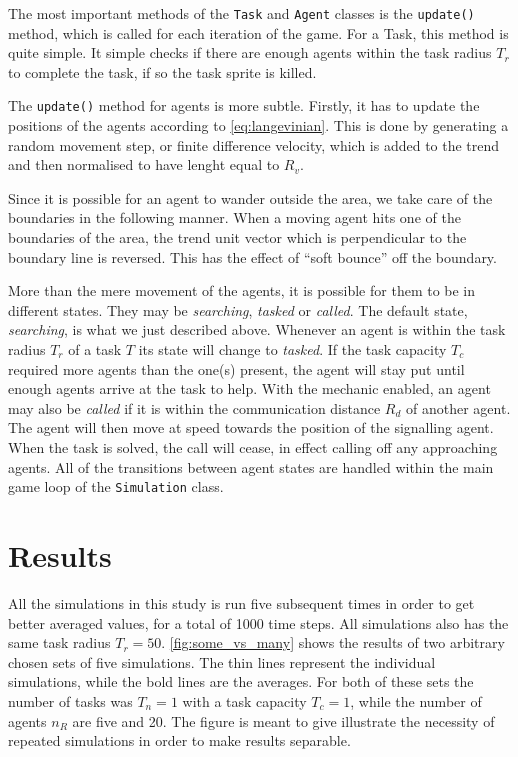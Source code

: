\documentclass[11pt]{article}
\begin{document}
    The most important methods of the \lstinline!Task! and \lstinline!Agent!
    classes is the \lstinline!update()! method, which is called for 
    each iteration of the game. For a Task, this method is 
    quite simple. It simple checks if there are enough agents within the 
    task radius $T_r$ to complete the task, if so the task sprite is killed.
    
    The \lstinline!update()! method for agents is more subtle. Firstly, it has to 
    update the positions of the agents according to \autoref{eq:langevinian}. 
    This is done by generating a random movement step, or finite difference velocity,
    which is added to the trend and then normalised to have lenght equal to $R_v$.

    Since it is possible for an agent to wander outside the area, we take care of 
    the boundaries in the following manner. When a moving agent hits one of the
    boundaries of the area, the trend unit vector which is perpendicular to 
    the boundary line is reversed. This has the effect of ``soft bounce'' 
    off the boundary.

    More than the mere movement of the agents, it is possible for them to be in
    different states. They may be \emph{searching}, \emph{tasked} or \emph{called}.
    The default state, \emph{searching}, is what we just described above. Whenever
    an agent is within the task radius $T_r$ of a task $T$ its state will change 
    to \emph{tasked}. If the task capacity $T_c$ required more agents than the
    one(s) present, the agent will stay put until enough agents arrive at the 
    task to help. With the mechanic enabled, an agent may also be \emph{called}
    if it is within the communication distance $R_d$ of another agent. The agent 
    will then move at speed towards the position of the signalling agent. When the 
    task is solved, the call will cease, in effect calling off any approaching agents.
    All of the transitions between agent states are handled within the main game loop 
    of the \lstinline!Simulation! class.

    \section{Results}

    All the simulations in this study is run five subsequent times in order to 
    get better averaged values, for a total of 1000 time steps. All simulations 
    also has the same task radius $T_r=50$.
    \autoref{fig:some_vs_many} shows the results of two arbitrary chosen sets
    of five simulations. The thin lines represent 
    the individual simulations, while the bold lines are the averages. For 
    both of these sets the number of tasks was $T_n=1$ with a task capacity $T_c=1$,
    while the number of agents $n_R$ are five and 20. The figure is meant to give 
    illustrate the necessity of repeated simulations in order to make 
    results separable.
\end{document}
